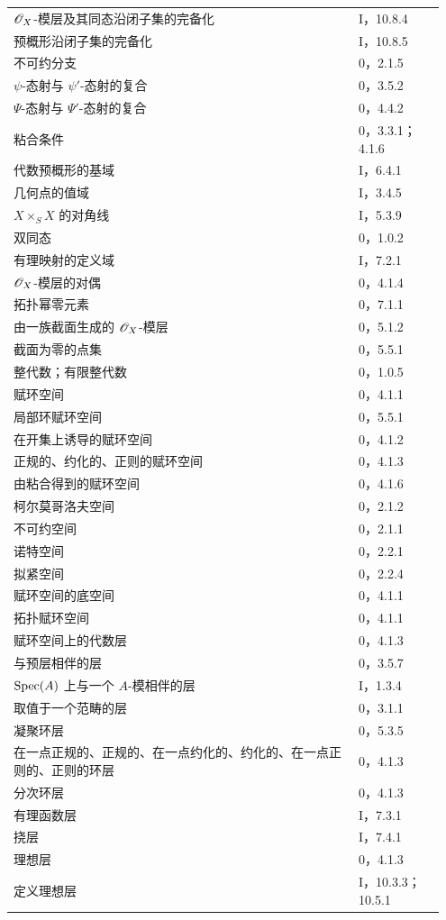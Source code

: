 \begin{longtable}{@{}p{0.76\linewidth}p{0.19\linewidth}@{}}
$\mathscr O_X$-模层及其同态沿闭子集的完备化&I，10.8.4\\
预概形沿闭子集的完备化&I，10.8.5\\
不可约分支&0，2.1.5\\
$\psi$-态射与 $\psi'$-态射的复合&0，3.5.2\\
$\Psi$-态射与 $\Psi'$-态射的复合&0，4.4.2\\
粘合条件&0，3.3.1；4.1.6\\
代数预概形的基域&I，6.4.1\\
几何点的值域&I，3.4.5\\
$X\times_S X$ 的对角线&I，5.3.9\\
双同态&0，1.0.2\\
有理映射的定义域&I，7.2.1\\
$\mathscr O_X$-模层的对偶&0，4.1.4\\
拓扑幂零元素&0，7.1.1\\
由一族截面生成的 $\mathscr O_X$-模层&0，5.1.2\\
截面为零的点集&0，5.5.1\\
整代数；有限整代数&0，1.0.5\\
赋环空间&0，4.1.1\\
局部环赋环空间&0，5.5.1\\
在开集上诱导的赋环空间&0，4.1.2\\
正规的、约化的、正则的赋环空间&0，4.1.3\\
由粘合得到的赋环空间&0，4.1.6\\
柯尔莫哥洛夫空间&0，2.1.2\\
不可约空间&0，2.1.1\\
诺特空间&0，2.2.1\\
拟紧空间&0，2.2.4\\
赋环空间的底空间&0，4.1.1\\
拓扑赋环空间&0，4.1.1\\
赋环空间上的代数层&0，4.1.3\\
与预层相伴的层&0，3.5.7\\
$\operatorname{Spec}(A)$ 上与一个 $A$-模相伴的层&I，1.3.4\\
取值于一个范畴的层&0，3.1.1\\
凝聚环层&0，5.3.5\\
在一点正规的、正规的、在一点约化的、约化的、在一点正则的、正则的环层&0，4.1.3\\
分次环层&0，4.1.3\\
有理函数层&I，7.3.1\\
挠层&I，7.4.1\\
理想层&0，4.1.3\\
定义理想层&I，10.3.3；10.5.1\\

\end{longtable}
